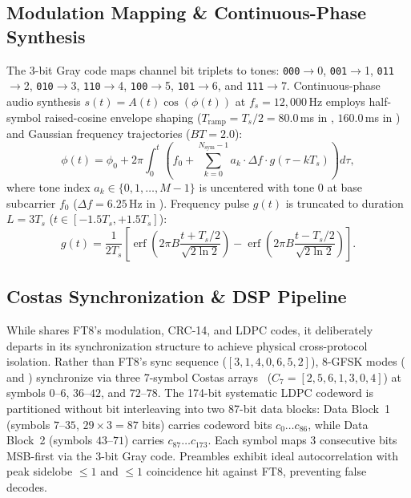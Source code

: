 \subsection{Modulation Mapping \& Continuous-Phase Synthesis}

The 3-bit Gray code maps channel bit triplets to tones: \texttt{000}$\to$0, \texttt{001}$\to$1, \texttt{011}$\to$2, \texttt{010}$\to$3, \texttt{110}$\to$4, \texttt{100}$\to$5, \texttt{101}$\to$6, and \texttt{111}$\to$7. Continuous-phase audio synthesis $s(t) = A(t) \cos(\phi(t))$ at $f_s = 12{,}000$\,Hz employs half-symbol raised-cosine envelope shaping ($T_{\text{ramp}} = T_s / 2 = 80.0$\,ms in , $160.0$\,ms in ) and Gaussian frequency trajectories ($BT = 2.0$):
{\setlength{\abovedisplayskip}{2pt plus 1.5pt minus 1.0pt}\setlength{\belowdisplayskip}{2pt plus 1.5pt minus 1.0pt}
\begin{equation}
  \phi(t) = \phi_0 + 2\pi \int_0^t \left( f_0 + \sum_{k=0}^{N_{\text{sym}}-1} a_k \cdot \Delta f \cdot g(\tau - k T_s) \right) d\tau,
\end{equation}
where tone index $a_k \in \{0, 1, \dots, M-1\}$ is uncentered with tone 0 at base subcarrier $f_0$ ($\Delta f = 6.25$\,Hz in ). Frequency pulse $g(t)$ is truncated to duration $L = 3 T_s$ ($t \in [-1.5 T_s, +1.5 T_s]$):
\begin{equation}
  g(t) = \frac{1}{2 T_s} \left[ \operatorname{erf}\left( 2\pi B \frac{t + T_s/2}{\sqrt{2 \ln 2}} \right) - \operatorname{erf}\left( 2\pi B \frac{t - T_s/2}{\sqrt{2 \ln 2}} \right) \right].
\end{equation}
}

\subsection{Costas Synchronization \& DSP Pipeline}
\label{sec:dsp_pipeline}

While  shares FT8's modulation, CRC-14, and LDPC codes, it deliberately departs in its synchronization structure to achieve physical cross-protocol isolation. Rather than FT8's sync sequence ($[3, 1, 4, 0, 6, 5, 2]$), 8-GFSK modes ( and ) synchronize via three 7-symbol Costas arrays~\cite{costas} ($C_7 = [2, 5, 6, 1, 3, 0, 4]$) at symbols $0\text{--}6$, $36\text{--}42$, and $72\text{--}78$. The 174-bit systematic LDPC codeword is partitioned without bit interleaving into two 87-bit data blocks: Data Block~1 (symbols $7\text{--}35$, $29 \times 3 = 87$ bits) carries codeword bits $c_0\dots c_{86}$, while Data Block~2 (symbols $43\text{--}71$) carries $c_{87}\dots c_{173}$. Each symbol maps 3 consecutive bits MSB-first via the 3-bit Gray code. Preambles exhibit ideal autocorrelation with peak sidelobe $\le 1$ and $\le 1$ coincidence hit against FT8, preventing false decodes.

